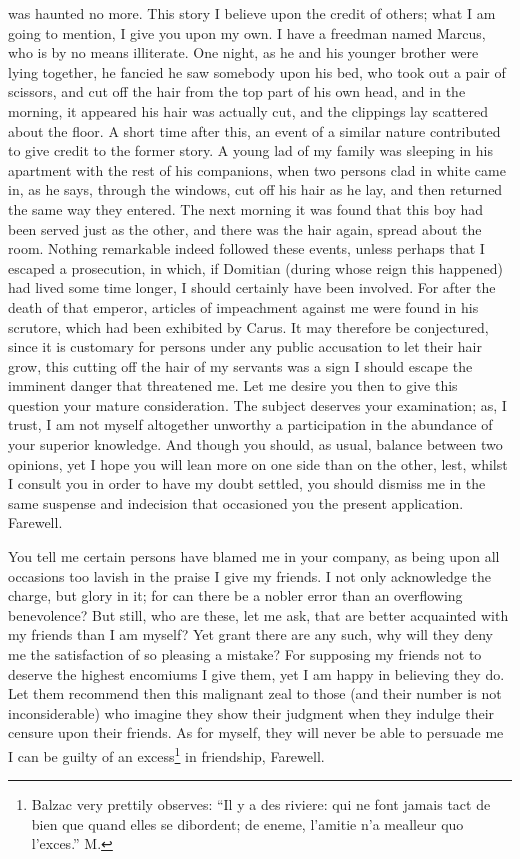 was haunted no more. This story I believe upon the credit of others; what
I am going to mention, I give you upon my own. I have a freedman named
Marcus, who is by no means illiterate. One night, as he and his younger
brother were lying together, he fancied he saw somebody upon his bed, who
took out a pair of scissors, and cut off the hair from the top part of his
own head, and in the morning, it appeared his hair was actually cut, and
the clippings lay scattered about the floor. A short time after this, an
event of a similar nature contributed to give credit to the former story.
A young lad of my family was sleeping in his apartment with the rest of
his companions, when two persons clad in white came in, as he says,
through the windows, cut off his hair as he lay, and then returned the
same way they entered. The next morning it was found that this boy had
been served just as the other, and there was the hair again, spread about
the room. Nothing remarkable indeed followed these events, unless perhaps
that I escaped a prosecution, in which, if Domitian (during whose reign
this happened) had lived some time longer, I should certainly have been
involved. For after the death of that emperor, articles of impeachment
against me were found in his scrutore, which had been exhibited by Carus.
It may therefore be conjectured, since it is customary for persons under
any public accusation to let their hair grow, this cutting off the hair of
my servants was a sign I should escape the imminent danger that threatened
me. Let me desire you then to give this question your mature
consideration. The subject deserves your examination; as, I trust, I am
not myself altogether unworthy a participation in the abundance of your
superior knowledge. And though you should, as usual, balance between two
opinions, yet I hope you will lean more on one side than on the other,
lest, whilst I consult you in order to have my doubt settled, you should
dismiss me in the same suspense and indecision that occasioned you the
present application. Farewell.


You tell me certain persons have blamed me in your company, as being upon
all occasions too lavish in the praise I give my friends. I not only
acknowledge the charge, but glory in it; for can there be a nobler error
than an overflowing benevolence? But still, who are these, let me ask,
that are better acquainted with my friends than I am myself? Yet grant
there are any such, why will they deny me the satisfaction of so pleasing
a mistake? For supposing my friends not to deserve the highest encomiums I
give them, yet I am happy in believing they do. Let them recommend then
this malignant zeal to those (and their number is not inconsiderable) who
imagine they show their judgment when they indulge their censure upon
their friends. As for myself, they will never be able to persuade me I can
be guilty of an excess\footnote{Balzac very prettily
observes: ``Il y a des riviere: qui ne font jamais tact de bien que quand
elles se dibordent; de eneme, l'amitie n'a mealleur quo l'exces.'' M.} in friendship, Farewell.

